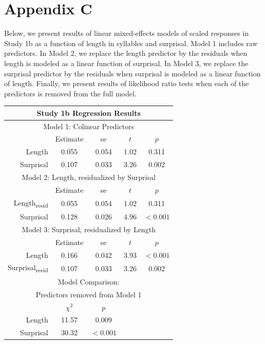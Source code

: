 \section{Appendix C}

Below, we present results of linear mixed-effects models of scaled responses in Study 1b as a function of length in syllables and surprisal.
Model 1 includes raw predictors.
In Model 2, we replace the length predictor by the residuals when length is modeled as a linear function of surprisal.
In Model 3, we replace the surprisal predictor by the residuals when surprisal is modeled as a linear function of length.
Finally, we present results of likelihood ratio tests when each of the predictors is removed from the full model.

\vspace{4mm}

\noindent
\footnotesize{
\begin{tabular}{r|cccc}
\hline
\hline
\multicolumn{5}{c}{\textbf{Study 1b Regression Results}} \\
\hline
\hline
\multicolumn{5}{c}{Model 1: Colinear Predictors} \\
& Estimate & se & $t$ & $p$ \\
\hline
Length & 0.055 & 0.054 & 1.02 & 0.311 \\
Surprisal & 0.107 & 0.033 & 3.26 & 0.002 \\
\hline
\hline
\multicolumn{5}{c}{Model 2: Length, residualized by Surprisal} \\
& Estimate & se & $t$ & $p$ \\
\hline
Length\textsubscript{resid} & 0.055 & 0.054 & 1.02 & 0.311 \\
Surprisal & 0.128 & 0.026 & 4.96 & $<0.001$ \\
\hline
\hline
\multicolumn{5}{c}{Model 3: Surprisal, residualized by Length} \\
& Estimate & se & $t$ & $p$ \\
\hline
Length & 0.166 & 0.042 & 3.93 & $<0.001$ \\
Surprisal\textsubscript{resid} & 0.107 & 0.033 & 3.26 & 0.002 \\
\hline
\hline
\multicolumn{5}{c}{Model Comparison:} \\
\multicolumn{5}{c}{Predictors removed from Model 1} \\
& $\chi^2$ & $p$ \\
\hline
Length & 11.57 & 0.009 \\
Surprisal & 30.32 & $<0.001$ \\
\hline
\hline
\end{tabular}
}



